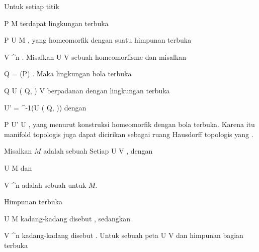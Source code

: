 Untuk setiap titik

\mavergleichskette
{\vergleichskette
{P
}
{ \in }{ M
}
{  }{
}
{    }{
}
{   }{
}
}
{}{}{}
terdapat lingkungan terbuka

\mavergleichskette
{\vergleichskette
{P
}
{ \in }{ U
}
{ \subseteq }{ M
}
{    }{
}
{   }{
}
}
{}{}{,}
yang homeomorfik dengan suatu himpunan terbuka

\mavergleichskette
{\vergleichskette
{V
}
{ \subseteq }{ \R^n
}
{  }{
}
{    }{
}
{   }{
}
}
{}{}{}.
Misalkan
\maabbdisp {\varphi} {U} {V
} {}
sebuah homeomorfisme dan misalkan

\mavergleichskette
{\vergleichskette
{ Q
}
{ = }{ \varphi(P)
}
{  }{
}
{    }{
}
{   }{
}
}
{}{}{.}
Maka lingkungan bola terbuka

\mavergleichskette
{\vergleichskette
{Q
}
{ \in }{ U \left(  Q, \epsilon  \right)
}
{ \subseteq }{ V
}
{    }{
}
{   }{
}
}
{}{}{}
berpadanan dengan lingkungan terbuka

\mavergleichskette
{\vergleichskette
{ U'
}
{ = }{  \varphi^{-1}(U \left(  Q, \epsilon  \right))
}
{  }{
}
{    }{
}
{   }{
}
}
{}{}{}
dengan

\mavergleichskette
{\vergleichskette
{P
}
{ \in }{ U'
}
{ \subseteq }{ U
}
{    }{
}
{   }{
}
}
{}{}{,}
yang menurut konstruksi homeomorfik dengan bola terbuka. Karena itu manifold topologis juga dapat dicirikan sebagai ruang Hausdorff topologis yang  {}.

{}
{

Misalkan $M$ adalah sebuah
Setiap
\maabbdisp {\varphi} { U } { V
} {,}
dengan

\mavergleichskette
{\vergleichskette
{ U
}
{ \subseteq }{ M
}
{  }{
}
{    }{
}
{   }{
}
}
{}{}{}
dan

\mavergleichskette
{\vergleichskette
{ V
}
{ \subseteq }{ \R^n
}
{  }{
}
{    }{
}
{   }{
}
}
{}{}{}
adalah sebuah
 {} {}
 untuk $M$.

}

Himpunan terbuka

\mavergleichskette
{\vergleichskette
{ U
}
{ \subseteq }{ M
}
{  }{
}
{    }{
}
{   }{
}
}
{}{}{}
kadang-kadang disebut  {}, sedangkan

\mavergleichskette
{\vergleichskette
{ V
}
{ \subseteq }{ \R^n
}
{  }{
}
{    }{
}
{   }{
}
}
{}{}{}
kadang-kadang disebut  {.} Untuk sebuah peta
\maabbdisp {\varphi} {U} {V
} {}
dan himpunan bagian terbuka

